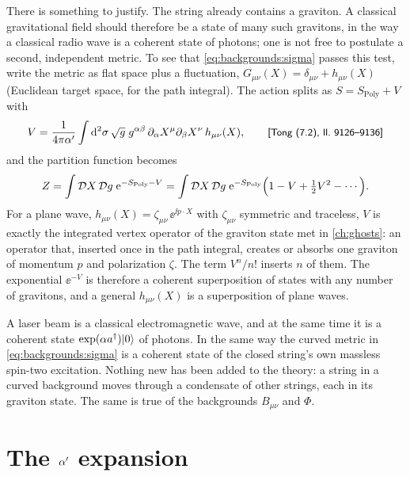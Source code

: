 There is something to justify. The string already contains a graviton. A classical
gravitational field should therefore be a state of many such gravitons, in the way a
classical radio wave is a coherent state of photons; one is not free to postulate a second,
independent metric. To see that \eqref{eq:backgrounds:sigma} passes this test, write the
metric as flat space plus a fluctuation, $G_{\mu\nu}(X)=\delta_{\mu\nu}+h_{\mu\nu}(X)$
(Euclidean target space, for the path integral). The action splits as
$S=S_{\mathrm{Poly}}+V$ with
\begin{equation}\label{eq:backgrounds:V}
  V=\frac{1}{4\pi\alpha'}\int\mathrm{d}^2\sigma\,\sqrt g\;g^{\alpha\beta}\,
  \partial_\alpha X^\mu\partial_\beta X^\nu\,h_{\mu\nu}(X),
  \qquad\text{{\small\textsf{[Tong (7.2), ll.~9126--9136]}}}
\end{equation}
and the partition function becomes
\begin{equation}\label{eq:backgrounds:coherent}
  Z=\int\mathcal DX\,\mathcal Dg\;\mathrm{e}^{-S_{\mathrm{Poly}}-V}
   =\int\mathcal DX\,\mathcal Dg\;\mathrm{e}^{-S_{\mathrm{Poly}}}
   \Bigl(1-V+\tfrac12V^2-\cdots\Bigr).
\end{equation}
For a plane wave, $h_{\mu\nu}(X)=\zeta_{\mu\nu}\,\ee^{\ii p\cdot X}$ with $\zeta_{\mu\nu}$
symmetric and traceless, $V$ is exactly the integrated vertex operator of the graviton state
met in \cref{ch:ghosts}: an operator that, inserted once in the path integral, creates or
absorbs one graviton of momentum $p$ and polarization $\zeta$. The term $V^n/n!$ inserts $n$
of them. The exponential $\ee^{-V}$ is therefore a coherent superposition of states with any
number of gravitons, and a general $h_{\mu\nu}(X)$ is a superposition of plane waves.

\begin{physicsbox}
A laser beam is a classical electromagnetic wave, and at the same time it is a coherent
state $\exp(\alpha a^\dagger)|0\rangle$ of photons. In the same way the curved metric in
\eqref{eq:backgrounds:sigma} is a coherent state of the closed string's own massless
spin-two excitation. Nothing new has been added to the theory: a string in a curved
background moves through a condensate of other strings, each in its graviton state. The
same is true of the backgrounds $B_{\mu\nu}$ and $\Phi$.
\end{physicsbox}

\section{The \texorpdfstring{$\alpha'$}{alpha'} expansion}\label{sec:backgrounds:alpha}

